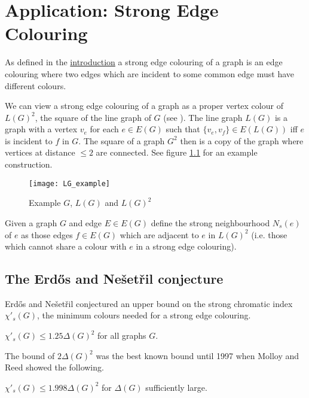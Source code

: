 \chapter{Application: Strong Edge Colouring}
\label{chap:strong_edge_colouring}

As defined in the \hyperref[sec:intro_strong_edge_coloring]{introduction}
a strong edge colouring of a graph is an edge colouring where two edges which are incident to some
common edge must have different colours.

We can view a strong edge colouring of a graph as a proper vertex colour of $L(G)^2$, the
square of the line graph of $G$ (see \cite{molloyBoundStrongChromatic1997}).
The line graph $L(G)$ is a graph with a vertex $v_e$ for
each $e\in E(G)$ such that $\{v_e, v_f\} \in E(L(G))$ iff $e$ is incident to $f$ in
$G$. The square of a graph $G^2$ then is a copy of the graph where vertices at distance $\leq 2$
are connected. See figure \ref{fig:lg_example} for an example construction.

\begin{figure}[ht]
    \centering
    \texttt{[image: LG\_example]}
    \caption{Example $G$, $L(G)$ and $L(G)^2$}
    \label{fig:lg_example}
\end{figure}

\begin{definition}
    Given a graph $G$ and edge $E \in E(G)$ define the strong neighbourhood
    $N_s(e)$ of $e$ as those edges $f \in E(G)$ which are adjacent to $e$ in 
    $L(G)^2$ (i.e. those which cannot share a colour with $e$ in a strong edge colouring).
\end{definition}

\section{The Erd\H{o}s and Nešetřil conjecture}

Erd\H{o}s and Nešetřil \cite{faudreeInducedMatchingsBipartite1989} conjectured an
upper bound on the strong chromatic index $\chi'_s(G)$, the minimum colours needed for
a strong edge colouring.

\begin{conjecture}
    $\chi'_s(G) \leq 1.25\Delta(G)^2$ for all graphs $G$.
\end{conjecture}

The bound of $2\Delta(G)^2$ was the best known bound until 1997 when Molloy and Reed
showed the following.
\begin{knowntheorem}
    $\chi'_s(G) \leq 1.998\Delta(G)^2$ for $\Delta(G)$ sufficiently large.
\end{knowntheorem}

